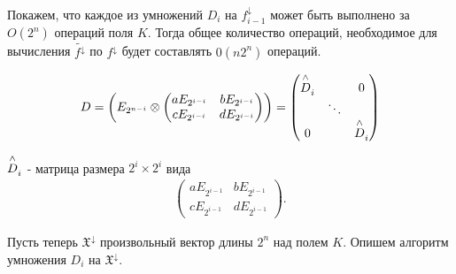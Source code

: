Покажем, что каждое из умножений $D_i$ на $f_{i-1}^\downarrow$ может быть выполнено за $O(2^n)$ операций поля $K$. Тогда общее количество операций, 
необходимое для вычисления $\widetilde{f^\downarrow}$ по $f^\downarrow$ будет составлять $0(n2^n)$ операций.

\begin{align*}
    D = \left( E_{2^{n-i}} \otimes
    \begin{pmatrix}
        aE_{2^{i-i}} & bE_{2^{i-i}}\\
        cE_{2^{i-i}} & dE_{2^{i-i}}
    \end{pmatrix}
    \right)
    =
    \begin{pmatrix}
        \overset{\wedge}{\mathstrut D}_i &  & 0 \\
        & \ddots & \\
        0 & & \overset{\wedge}{\mathstrut D}_i
    \end{pmatrix}
\end{align*}

$\overset{\wedge}{\mathstrut D}_i$ - матрица размера $2^i \times 2^i$ вида
\begin{align*}
    \begin{pmatrix}
        aE_{2^{i-1}} & bE_{2^{i-1}}\\
        cE_{2^{i-1}} & dE_{2^{i-1}}
    \end{pmatrix}.
\end{align*}

Пусть теперь $\mathfrak{X}^\downarrow$ произвольный вектор длины $2^n$ над полем $K$. Опишем алгоритм умножения $D_i$ на $\mathfrak{X}^\downarrow$.

